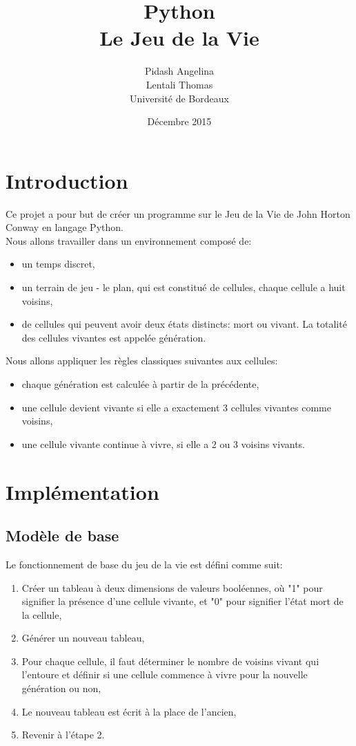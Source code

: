 \documentclass{article}
\title{Python \\Le Jeu de la Vie}
\author{Pidash Angelina\\ Lentali Thomas \\Université de Bordeaux }
\date{Décembre 2015}
\begin{document}
\maketitle

\section{Introduction}
Ce projet a pour but de créer un programme sur le Jeu de la Vie de John Horton Conway en langage Python.\\
Nous allons travailler dans un environnement composé de:

\begin{itemize}
\item un temps discret,
\item un terrain de jeu - le plan, qui est constitué de cellules, chaque cellule a huit voisins,
\item de cellules qui peuvent avoir deux états distincts: mort ou vivant. La totalité des cellules vivantes est appelée génération.

\end{itemize}

\noindent Nous allons appliquer les règles classiques suivantes aux cellules:
\begin{itemize}
\item chaque génération est calculée à partir de la précédente,
\item une cellule devient vivante si elle a exactement 3 cellules vivantes comme voisins,
\item une cellule vivante continue à vivre, si elle a  2 ou 3 voisins vivants.
\end{itemize}

\section{Implémentation}

\subsection{Modèle de base}

Le fonctionnement de base du jeu de la vie est défini comme suit:
\begin{enumerate}
\item Créer un tableau à deux dimensions de valeurs booléennes, où "1" pour signifier la présence d'une cellule vivante, et "0" pour signifier l’état mort de la cellule,
\item Générer un nouveau tableau,
\item Pour chaque cellule, il faut déterminer le nombre de voisins vivant qui l'entoure et définir si une cellule commence à vivre pour la nouvelle génération ou non,
\item Le nouveau tableau est écrit à la place de l'ancien,
\item Revenir à l'étape 2.
\end{enumerate}
\end{document}
